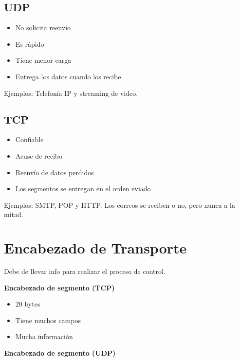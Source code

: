 \documentclass{article}
\begin{document}
\subsection{UDP}

\begin{itemize}
	\item
	No solicita reenvío
	\item
	Es rápido
	\item
	Tiene menor carga
	\item
	Entrega los datos cuando los recibe
\end{itemize}
\vspace{1em}

Ejemplos: Telefonía IP y streaming de video.

\subsection{TCP}

\begin{itemize}
	\item
	Confiable
	\item
	Acuse de recibo
	\item
	Reenvío de datos perdidos
	\item
	Los segmentos se entregan en el orden eviado
\end{itemize}
\vspace{1em}

Ejemplos: SMTP, POP y HTTP. Los correos se reciben o no, pero nunca a la mitad.

\section{Encabezado de Transporte}

Debe de llevar info para realizar el proceso de control.
\vspace{1em}

\textbf{Encabezado de segmento (TCP)}
\vspace{1em}

\begin{itemize}
	\item
	20 bytes
	\item
	Tiene muchos campos
	\item
	Mucha información
\end{itemize}
\vspace{1em}

\textbf{Encabezado de segmento (UDP)}
\vspace{1em}
\end{document}

